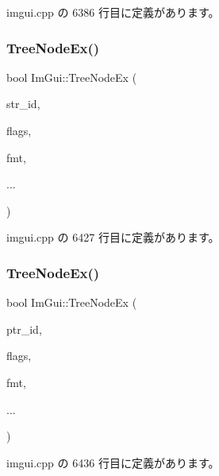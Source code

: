  imgui.\+cpp の 6386 行目に定義があります。

\mbox{\label{namespace_im_gui_a9ca2fae922b38cfddc3259f874c18a5d}} 
\subsubsection{\texorpdfstring{Tree\+Node\+Ex()}{TreeNodeEx()}\hspace{0.1cm}{\footnotesize\ttfamily [2/3]}}
{\footnotesize\ttfamily bool Im\+Gui\+::\+Tree\+Node\+Ex (\begin{DoxyParamCaption}\item[{const char $\ast$}]{str\+\_\+id,  }\item[{\mbox{\hyperlink{imgui_8h_a0588fdd10c59b49a0159484fe9ec4564}{Im\+Gui\+Tree\+Node\+Flags}}}]{flags,  }\item[{const char $\ast$}]{fmt,  }\item[{}]{... }\end{DoxyParamCaption})}



 imgui.\+cpp の 6427 行目に定義があります。

\mbox{\label{namespace_im_gui_adce362ad94baa9b00f5914cbcab00452}} 
\subsubsection{\texorpdfstring{Tree\+Node\+Ex()}{TreeNodeEx()}\hspace{0.1cm}{\footnotesize\ttfamily [3/3]}}
{\footnotesize\ttfamily bool Im\+Gui\+::\+Tree\+Node\+Ex (\begin{DoxyParamCaption}\item[{const void $\ast$}]{ptr\+\_\+id,  }\item[{\mbox{\hyperlink{imgui_8h_a0588fdd10c59b49a0159484fe9ec4564}{Im\+Gui\+Tree\+Node\+Flags}}}]{flags,  }\item[{const char $\ast$}]{fmt,  }\item[{}]{... }\end{DoxyParamCaption})}



 imgui.\+cpp の 6436 行目に定義があります。

